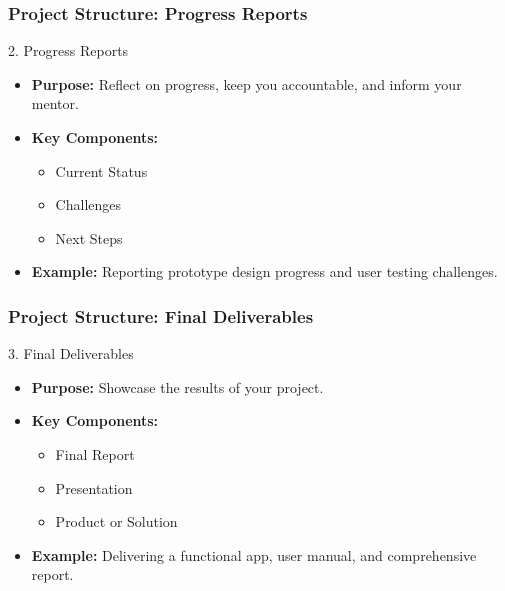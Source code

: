 \documentclass[aspectratio=169]{beamer}
\begin{document}
\begin{frame}[fragile]
    \frametitle{Project Structure: Progress Reports}
    \begin{block}{2. Progress Reports}
        \begin{itemize}
            \item \textbf{Purpose:} Reflect on progress, keep you accountable, and inform your mentor.
            \item \textbf{Key Components:}
                \begin{itemize}
                    \item Current Status
                    \item Challenges
                    \item Next Steps
                \end{itemize}
            \item \textbf{Example:} Reporting prototype design progress and user testing challenges.
        \end{itemize}
    \end{block}
\end{frame}

\begin{frame}[fragile]
    \frametitle{Project Structure: Final Deliverables}
    \begin{block}{3. Final Deliverables}
        \begin{itemize}
            \item \textbf{Purpose:} Showcase the results of your project.
            \item \textbf{Key Components:}
                \begin{itemize}
                    \item Final Report
                    \item Presentation
                    \item Product or Solution
                \end{itemize}
            \item \textbf{Example:} Delivering a functional app, user manual, and comprehensive report.
        \end{itemize}
    \end{block}
\end{frame}
\end{document}
